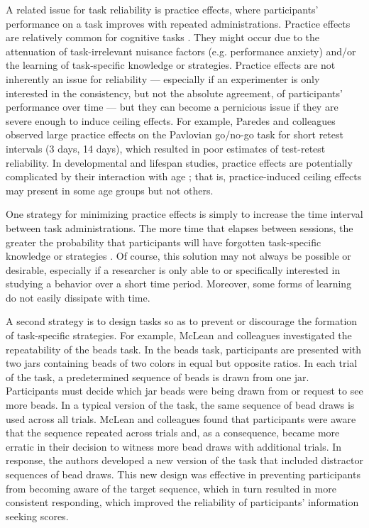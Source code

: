 \documentclass[a4paper,notitlepage,12pt]{article}
\begin{document}
A related issue for task reliability is practice effects, where participants' performance on a task improves with repeated administrations. Practice effects are relatively common for cognitive tasks \cite{hausknecht2007retesting, scharfen2018retest}. They might occur due to the attenuation of task-irrelevant nuisance factors (e.g. performance anxiety) and/or the learning of task-specific knowledge or strategies. Practice effects are not inherently an issue for reliability --- especially if an experimenter is only interested in the consistency, but not the absolute agreement, of participants' performance over time --- but they can become a pernicious issue if they are severe enough to induce ceiling effects. For example, Paredes and colleagues \cite{paredes2021psychometric} observed large practice effects on the Pavlovian go/no-go task for short retest intervals (3 days, 14 days), which resulted in poor estimates of test-retest reliability. In developmental and lifespan studies, practice effects are potentially complicated by their interaction with age \cite{anokhin2022age, salthouse2010influence}; that is, practice-induced ceiling effects may present in some age groups but not others. 

One strategy for minimizing practice effects is simply to increase the time interval between task administrations. The more time that elapses between sessions, the greater the probability that participants will have forgotten task-specific knowledge or strategies \cite{hausknecht2007retesting, scharfen2018retest}. Of course, this solution may not always be possible or desirable, especially if a researcher is only able to or specifically interested in studying a behavior over a short time period. Moreover, some forms of learning do not easily dissipate with time.

A second strategy is to design tasks so as to prevent or discourage the formation of task-specific strategies. For example, McLean and colleagues \cite{mclean2018towards} investigated the repeatability of the beads task. In the beads task, participants are presented with two jars containing beads of two colors in equal but opposite ratios. In each trial of the task, a predetermined sequence of beads is drawn from one jar. Participants must decide which jar beads were being drawn from or request to see more beads. In a typical version of the task, the same sequence of bead draws is used across all trials. McLean and colleagues found that participants were aware that the sequence repeated across trials and, as a consequence, became more erratic in their decision to witness more bead draws with additional trials. In response, the authors developed a new version of the task that included distractor sequences of bead draws. This new design was effective in preventing participants from becoming aware of the target sequence, which in turn resulted in more consistent responding, which improved the reliability of participants' information seeking scores. 
\end{document}
